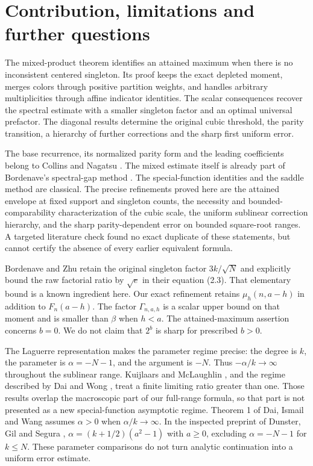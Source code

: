 \section{Contribution, limitations and further questions}

The mixed-product theorem identifies an attained maximum when there is no inconsistent centered singleton. Its proof keeps the exact depleted moment, merges colors through positive partition weights, and handles arbitrary multiplicities through affine indicator identities. The scalar consequences recover the spectral estimate with a smaller singleton factor and an optimal universal prefactor. The diagonal results determine the original cubic threshold, the parity transition, a hierarchy of further corrections and the sharp first uniform error.

The base recurrence, its normalized parity form and the leading coefficients belong to Collins and Nagatsu \cite{CN}. The mixed estimate itself is already part of Bordenave's spectral-gap method \cite{Bordenave}. The special-function identities and the saddle method are classical. The precise refinements proved here are the attained envelope at fixed support and singleton counts, the necessity and bounded-comparability characterization of the cubic scale, the uniform sublinear correction hierarchy, and the sharp parity-dependent error on bounded square-root ranges. A targeted literature check found no exact duplicate of these statements, but cannot certify the absence of every earlier equivalent formula.

Bordenave and Zhu \cite[Lemma 2.1]{BZ} retain the original singleton factor $3k/\sqrt N$ and explicitly bound the raw factorial ratio by $\sqrt e$ in their equation (2.3). That elementary bound is a known ingredient here. Our exact refinement retains $\mu_h(n,a-h)$ in addition to $F_n(a-h)$. The factor $\Gamma_{n,a,h}$ is a scalar upper bound on that moment and is smaller than $\beta$ when $h<a$. The attained-maximum assertion concerns $b=0$. We do not claim that $2^b$ is sharp for prescribed $b>0$.

The Laguerre representation makes the parameter regime precise: the degree is $k$, the parameter is $\alpha=-N-1$, and the argument is $-N$. Thus $-\alpha/k\to\infty$ throughout the sublinear range. Kuijlaars and McLaughlin \cite{KM}, and the regime described by Dai and Wong \cite{DW}, treat a finite limiting ratio greater than one. Those results overlap the macroscopic part of our full-range formula, so that part is not presented as a new special-function asymptotic regime. Theorem 1 of Dai, Ismail and Wang \cite{DIW} assumes $\alpha>0$ when $\alpha/k\to\infty$. In the inspected preprint of Dunster, Gil and Segura \cite[Section 1, equation (1.6) and Cases 1a, 1b and 2]{DGS}, $\alpha=(k+1/2)(a^2-1)$ with $a\ge0$, excluding $\alpha=-N-1$ for $k\le N$. These parameter comparisons do not turn analytic continuation into a uniform error estimate.

